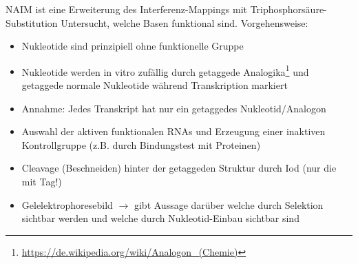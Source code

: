 NAIM ist eine Erweiterung des Interferenz-Mappings mit Triphosphorsäure-Substitution
Untersucht, welche Basen funktional sind. Vorgehensweise:
\begin{itemize}
\item Nukleotide sind prinzipiell ohne funktionelle Gruppe
\item Nukleotide werden in vitro zufällig durch getaggede Analogika\footnote{\url{https://de.wikipedia.org/wiki/Analogon_(Chemie)}} und getaggede normale Nukleotide während Transkription markiert
\item Annahme: Jedes Transkript hat nur ein getaggedes Nukleotid/Analogon
\item Auswahl der aktiven funktionalen RNAs und Erzeugung einer inaktiven Kontrollgruppe (z.B. durch Bindungstest mit Proteinen)
\item Cleavage (Beschneiden) hinter der getaggeden Struktur durch Iod (nur die mit Tag!)
\item Gelelektrophoresebild $\rightarrow$ gibt Aussage darüber welche durch Selektion sichtbar werden und welche durch Nukleotid-Einbau sichtbar sind
\end{itemize}